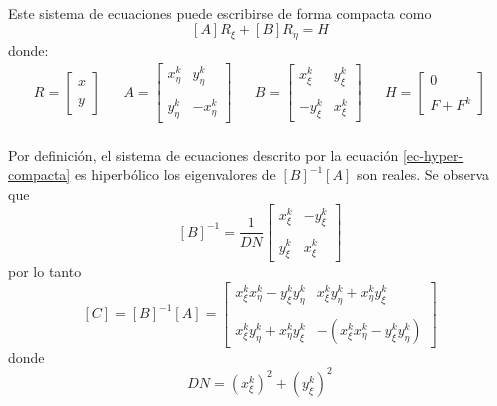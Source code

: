\documentclass[letterpaper, openright, 12pt]{book}
\begin{document}
		\paragraph*{}
			Este sistema de ecuaciones puede escribirse de forma compacta como
			\begin{equation}
				\left[A \right] R_{\xi} + \left[ B \right] R_{\eta} = H
				\label{ec-hyper-compacta}
			\end{equation}
			donde:
			\begin{align*}
				R = \begin{bmatrix}
				 x \\ \\
				 y
				\end{bmatrix}&&
				A = \begin{bmatrix}
					x_{\eta}^{k} & y_{\eta}^{k} \\ \\
					y_{\eta}^{k} & -x_{\eta}^{k}
				\end{bmatrix}&&
				B = \begin{bmatrix}
					x_{\xi}^{k} & y_{\xi}^{k} \\ \\
					-y_{\xi}^{k} & x_{\xi}^{k}
				\end{bmatrix}&&
				H = \begin{bmatrix}
					0 \\ \\
					F + F^{k}
				\end{bmatrix}
			\end{align*}
		
		\paragraph*{}
			Por definición, el sistema de ecuaciones descrito por la ecuación \ref{ec-hyper-compacta} es hiperbólico los eigenvalores de $\left[ B \right]^{-1} \left[ A \right]$ son reales. Se observa que\\
			\begin{equation*}
				\left[ B \right]^{-1} = \frac{1}{DN}\begin{bmatrix}
					x_{\xi}^{k} & -y_{\xi}^{k} \\ \\
					y_{\xi}^{k} & x_{\xi}^{k}
				\end{bmatrix}
			\end{equation*}
			por lo tanto
			\begin{equation*}
				\left[ C \right] = \left[ B \right]^{-1} \left[ A \right] = \begin{bmatrix}
					x_{\xi}^{k} x_{\eta}^{k} - y_{\xi}^{k} y_{\eta}^{k} &
					x_{\xi}^{k} y_{\eta}^{k} + x_{\eta}^{k} y_{\xi}^{k} \\ \\
					x_{\xi}^{k} y_{\eta}^{k} + x_{\eta}^{k} y_{\xi}^{k} &
					- \left( x_{\xi}^{k} x_{\eta}^{k} - y_{\xi}^{k} y_{\eta}^{k} \right)
				\end{bmatrix}
			\end{equation*}
			donde
			\begin{equation*}
				DN = \left( x_{\xi}^{k} \right)^2 + \left( y_{\xi}^{k} \right)^2
			\end{equation*}
		
\end{document}
